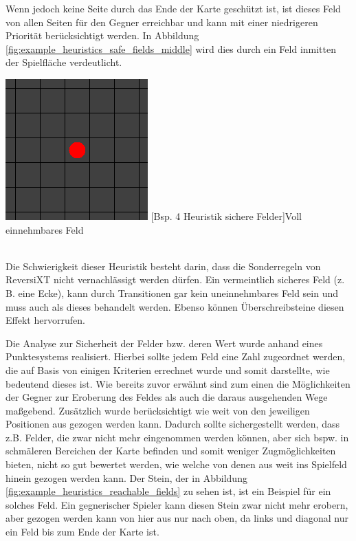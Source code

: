 \documentclass[12pt,a4paper,bibliography=totocnumbered,listof=totocnumbered]{article}
\begin{document}
Wenn jedoch keine Seite durch das Ende der Karte geschützt ist, ist dieses Feld von allen Seiten für den Gegner erreichbar und kann mit einer niedrigeren Priorität berücksichtigt werden. In Abbildung \ref{fig:example_heuristics_safe_fields_middle} wird dies durch ein Feld inmitten der Spielfläche verdeutlicht.

\vspace{1em}
\begin{minipage}{\linewidth}
	\centering
	\includegraphics[width=0.3\linewidth]{pics/heuristics_safe_fields_middle.png}
	[Bsp. 4 Heuristik sichere Felder]{Voll einnehmbares Feld}
	\label{fig:example_heuristics_safe_fields_middle}
\end{minipage}
\\

Die Schwierigkeit dieser Heuristik besteht darin, dass die Sonderregeln von ReversiXT nicht vernachlässigt werden dürfen. Ein vermeintlich sicheres Feld (z. B. eine Ecke), kann durch Transitionen gar kein uneinnehmbares Feld sein und muss auch als dieses behandelt werden. Ebenso können Überschreibsteine diesen Effekt hervorrufen.

Die Analyse zur Sicherheit der Felder bzw. deren Wert wurde anhand eines Punktesystems realisiert. Hierbei sollte jedem Feld eine Zahl zugeordnet werden, die auf Basis von einigen Kriterien errechnet wurde und somit darstellte, wie bedeutend dieses ist. Wie bereits zuvor erwähnt sind zum einen die Möglichkeiten der Gegner zur Eroberung des Feldes als auch die daraus ausgehenden Wege maßgebend. Zusätzlich wurde berücksichtigt wie weit von den jeweiligen Positionen aus gezogen werden kann. Dadurch sollte sichergestellt werden, dass z.B. Felder, die zwar nicht mehr eingenommen werden können, aber sich bspw. in schmäleren Bereichen der Karte befinden und somit weniger Zugmöglichkeiten bieten, nicht so gut bewertet werden, wie welche von denen aus weit ins Spielfeld hinein gezogen werden kann. Der Stein, der in Abbildung \ref{fig:example_heuristics_reachable_fields} zu sehen ist, ist ein Beispiel für ein solches Feld. Ein gegnerischer Spieler kann diesen Stein zwar nicht mehr erobern, aber gezogen werden kann von hier aus nur nach oben, da links und diagonal nur ein Feld bis zum Ende der Karte ist.
\end{document}
